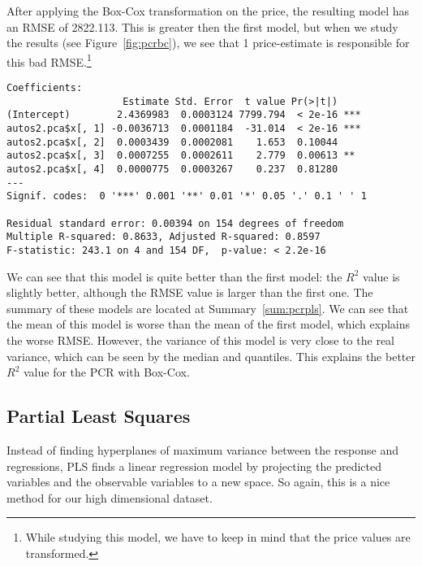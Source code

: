 After applying the Box-Cox transformation on the price, the resulting model has an RMSE of 2822.113. This is greater then the first model, but when we study the results (see Figure~\ref{fig:pcrbc}), we see that 1 price-estimate is responsible for this bad RMSE.\footnote{While studying this model, we have to keep in mind that the price values are transformed.}
\begin{verbatim}
Coefficients:
                    Estimate Std. Error  t value Pr(>|t|)
(Intercept)        2.4369983  0.0003124 7799.794  < 2e-16 ***
autos2.pca$x[, 1] -0.0036713  0.0001184  -31.014  < 2e-16 ***
autos2.pca$x[, 2]  0.0003439  0.0002081    1.653  0.10044
autos2.pca$x[, 3]  0.0007255  0.0002611    2.779  0.00613 **
autos2.pca$x[, 4]  0.0000775  0.0003267    0.237  0.81280
---
Signif. codes:  0 '***' 0.001 '**' 0.01 '*' 0.05 '.' 0.1 ' ' 1 

Residual standard error: 0.00394 on 154 degrees of freedom
Multiple R-squared: 0.8633,	Adjusted R-squared: 0.8597
F-statistic: 243.1 on 4 and 154 DF,  p-value: < 2.2e-16
\end{verbatim}

We can see that this model is quite better than the first model: the $R^2$ value is slightly better, although the RMSE value is larger than the first one. The summary of these models are located at Summary~\ref{sum:pcrpls}. We can see that the mean of this model is worse than the mean of the first model, which explains the worse RMSE. However, the variance of this model is very close to the real variance, which can be seen by the median and quantiles. This explains the better $R^2$ value for the PCR with Box-Cox.

\subsection{Partial Least Squares}
Instead of finding hyperplanes of maximum variance between the response and regressions, PLS finds a linear regression model by projecting the predicted variables and the observable variables to a new space. So again, this is a nice method for our high dimensional dataset.

